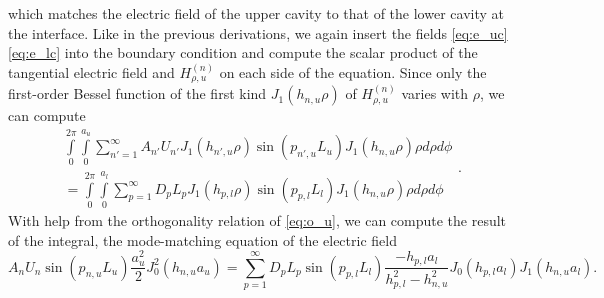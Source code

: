 which matches the electric field of the upper cavity to that of the lower cavity at the interface. Like in the previous derivations, we again insert the fields \eqref{eq:e_uc}\eqref{eq:e_lc} into the boundary condition and compute the scalar product of the tangential electric field and $H_{\rho,u}^{(n)}$ on each side of the equation. Since only the first-order Bessel function of the first kind $J_1(h_{n,u}\rho)$ of $H_{\rho,u}^{(n)}$ varies with $\rho$, we can compute
\begin{equation}
\begin{split}
\int\limits_0^{2\pi}\int\limits_0^{a_u}\sum\limits_{n'=1}^\infty A_{n'}U_{n'}J_1(h_{n',u}\rho)\sin(p_{n',u}L_u)J_1(h_{n,u}\rho)\rho\mathit{d\rho d\phi}\\=\int\limits_0^{2\pi}\int\limits_0^{a_l}\sum\limits_{p=1}^\infty D_{p}L_{p}J_1(h_{p,l}\rho)\sin(p_{p,l}L_l)J_1(h_{n,u}\rho)\rho\mathit{d\rho d\phi}
\end{split}\text{.}
\end{equation}
With help from the orthogonality relation of \eqref{eq:o_u}, we can compute the result of the integral, the mode-matching equation of the electric field
\begin{equation}\label{eq:c_mm_e}
A_nU_n\sin(p_{n,u}L_u)\frac{a_u^2}{2}J_0^2(h_{n,u}a_u)=\sum\limits_{p=1}^\infty D_pL_p\sin(p_{p,l}L_l)\frac{-h_{p,l}a_l}{h_{p,l}^2-h_{n,u}^2}J_0(h_{p,l}a_l)J_1(h_{n,u}a_l)\text{.}
\end{equation}

